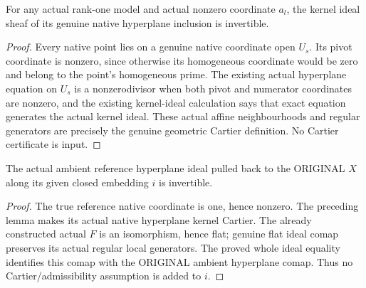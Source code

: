 \begin{lemma}
\label{lem:seven-native-coordinate-hyperplane-ker-cartier-route}
\leanok
{}
For any actual rank-one model and actual nonzero coordinate $a_l$, the
kernel ideal sheaf of its genuine native hyperplane inclusion is invertible.
\end{lemma}
\begin{proof}
Every native point lies on a genuine native coordinate open $U_s$. Its
pivot coordinate is nonzero, since otherwise its homogeneous coordinate
would be zero and belong to the point's homogeneous prime. The existing
actual hyperplane equation on $U_s$ is a nonzerodivisor when both pivot
and numerator coordinates are nonzero, and the existing kernel-ideal
calculation says that exact equation generates the actual kernel ideal.
These actual affine neighbourhoods and regular generators are precisely
the genuine geometric Cartier definition. No Cartier certificate is input.
\end{proof}

\begin{lemma}
\label{lem:seven-original-coordinate-hyperplane-comap-cartier-route}
\leanok
{}
The actual ambient reference hyperplane ideal pulled back to the ORIGINAL
$X$ along its given closed embedding $i$ is invertible.
\end{lemma}
\begin{proof}
The true reference native coordinate is one, hence nonzero. The preceding
lemma makes its actual native hyperplane kernel Cartier. The already
constructed actual $F$ is an isomorphism, hence flat; genuine flat ideal
comap preserves its actual regular local generators. The proved whole
ideal equality identifies this comap with the ORIGINAL ambient hyperplane
comap. Thus no Cartier/admissibility assumption is added to $i$.
\end{proof}

